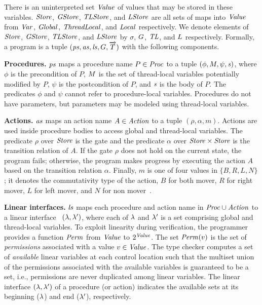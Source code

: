There is an uninterpreted set $\mathit{Value}$ of values that may be stored in these variables.
$\mathit{Store}$, $\mathit{GStore}$, $\mathit{TLStore}$, and $\mathit{LStore}$ are all sets of maps into $\mathit{Value}$
from $\mathit{Var}$, $\mathit{Global}$, $\mathit{ThreadLocal}$, and $\mathit{Local}$ respectively.
We denote elements of $\mathit{Store}$, $\mathit{GStore}$, $\mathit{TLStore}$, and $\mathit{LStore}$
by $\sigma$, $G$, $\mathit{TL}$, and $L$ respectively.
Formally, a \civl program is a tuple $(\mathit{ps}, \mathit{as}, \mathit{ls}, G, \overrightarrow{T})$ with the following components.

\noindent
{\bf Procedures.}
$\mathit{ps}$ maps a procedure name $P \in \mathit{Proc}$ to a tuple $(\phi, M, \psi, \mathit{s})$, 
where $\phi$ is the precondition of $P$, $M$ is the set of thread-local variables potentially modified by $P$, 
$\psi$ is the postcondition of $P$, and $\mathit{s}$ is the body of $P$.
The predicates $\phi$ and $\psi$ cannot refer to procedure-local variables.
Procedures do not have parameters, but parameters may be modeled using thread-local variables.

\noindent
{\bf Actions.}
$\mathit{as}$ maps an action name $A \in \mathit{Action}$ to a tuple $(\rho,\alpha,m)$.
Actions are used inside procedure bodies to access global and thread-local variables.
The predicate $\rho$ over $\mathit{Store}$ is the gate and the predicate $\alpha$ over $\mathit{Store} \times \mathit{Store}$ 
is the transition relation of $A$.
If the gate $\rho$ does not hold on the current state, the program fails;
otherwise, the program makes progress by executing the action $A$ based on the transition relation $\alpha$.
Finally, $m$ is one of four values in $\{B,R,L,N\}$;
it denotes the commutativity type of the action, $B$ for both mover, $R$ for right mover, $L$ for left mover, 
and $N$ for non mover~\cite{FlanaganFLQ08}. 

\noindent
{\bf Linear interfaces.}
$\mathit{ls}$ maps each procedure and action name in $\mathit{Proc} \cup \mathit{Action}$ to a linear interface~\cite{Wadler90lineartypes}
$(\lambda,\lambda')$, where each of $\lambda$ and $\lambda'$ is a set comprising global and thread-local variables.
To exploit linearity during verification, the programmer provides a function $\mathit{Perm}$ from $\mathit{Value}$ to $2^{\mathit{Value}}$.
The set $\mathit{Perm}(v)$ is the set of {\em permissions\/} associated with a value $v \in \mathit{Value}$.
The \civl type checker computes a set of {\em available\/} linear variables at each control location such that
the multiset union of the permissions associated with the available variables is guaranteed to be a set, i.e., 
permissions are never duplicated among linear variables.
The linear interface $(\lambda, \lambda')$ of a procedure (or action) indicates the available sets
at its beginning ($\lambda$) and end ($\lambda'$), respectively.

